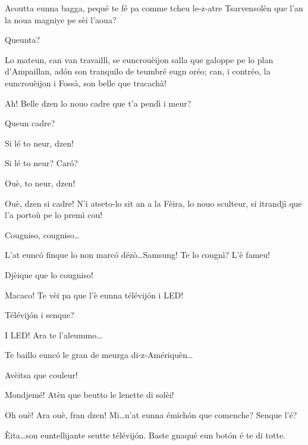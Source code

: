\begin{drama}
\Vioupspeaks Acoutta eunna bagga, pequé te fé pa comme tcheu le-z-atre Tsarvensolèn que l'an la noua magniye pe sèi l'aoua?

\Vioujspeaks Queunta?

\Vioupspeaks Lo mateun, can van travaillì, se euncrouèijon salla que galoppe pe lo plan d'Ampaillan, ad\'on son tranquilo de teumbré eugn oréo; can, i contréo, la euncrouèijon i Fossà, son belle que tracachà!

\Vioujspeaks Ah! Belle dzen lo nouo cadre que t'a pendì i meur?

\Vioupspeaks Queun cadre?

\Vioujspeaks Si lé to neur, dzen!

\Vioupspeaks Si lé to neur? Car\'o?

\Vioujspeaks Ouè, to neur, dzen!

\Vioupspeaks Ouè, dzen si cadre! N'i atseto-lo sit an a la Fèira, lo nouo sculteur, si itrandjì que l'a portoù pe lo premì cou!

\Vioujspeaks Cougniso, cougniso\ldots

\Vioupspeaks L'at eunc\'o finque lo non marc\'o dézò\ldots Samsung! Te lo cougnì? L'è fameu!

\Vioujspeaks Djèique que lo cougniso!

\Vioupspeaks Macaco! Te vèi pa que l'è eunna télévij\'on i LED!

\Vioujspeaks{} Télévij\'on i senque?

\Vioupspeaks I LED! Ara te l'aleummo\ldots


\Vioupspeaks Te baillo eunc\'o le gran de meurga di-z-Amériquèn\ldots


\Vioupspeaks Avèitsa que couleur!

\Vioujspeaks Mondjemé! Atèn que beutto le lenette di solèi!


\Vioujspeaks Oh ouè! Ara ouè, fran dzen! Mi\ldots n'at eunna émich\'on que comenche? Senque l'é?

\Vioupspeaks \`Eita\ldots son euntellijante seutte télévij\'on. Baste gnaqué eun bot\'on é te di totte.


\end{drama}
